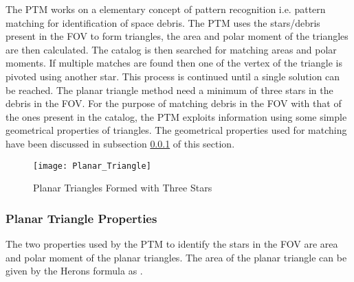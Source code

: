 \documentclass[]{aiaa-tc}%
\begin{document}
The PTM works on a elementary concept of pattern recognition i.e. pattern matching for identification of space debris. The PTM uses the stars/debris present in the FOV to form triangles, the area and polar moment of the triangles are then calculated. The catalog is then searched for matching areas and polar moments. If multiple matches are found then one of the vertex of the triangle is pivoted using another star. This process is continued until a single solution can be reached. The planar triangle method need a minimum of three stars in the debris in the FOV. For the purpose of matching debris in the FOV with that of the ones present in the catalog, the PTM exploits information using some simple geometrical properties of triangles. The geometrical properties used for matching have been discussed in subsection \ref{PTM Properties} of this section. 

\begin{figure}[t]
\label{triangles_with_Stars}
\centering
\texttt{[image: Planar\_Triangle]}
\caption{ Planar Triangles Formed with Three Stars}
\end{figure}

\subsubsection{Planar Triangle Properties}
\label{PTM Properties}

The two properties used by the PTM to identify the stars in the FOV are area and polar moment of the planar triangles. The area of the planar triangle can be given by the Herons formula as \cite{cole_fast_2006}.
\end{document}
